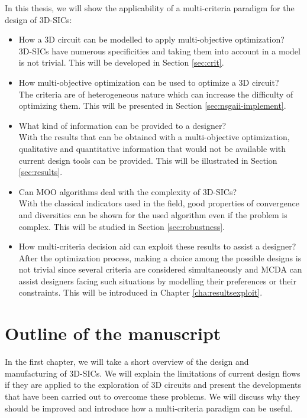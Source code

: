 In this thesis, we will show the applicability of a multi-criteria paradigm for the design of 3D-SICs:
\begin{itemize}
\item How a 3D circuit can be modelled to apply multi-objective optimization?\\
3D-SICs have numerous specificities and taking them into account in a model is not trivial. This will be developed in Section \ref{sec:crit}.

\item How multi-objective optimization can be used to optimize a 3D circuit?\\
The criteria are of heterogeneous nature which can increase the difficulty of optimizing them. This will be presented in Section \ref{sec:nsgaii-implement}.

\item What kind of information can be provided to a designer?\\
With the results that can be obtained with a multi-objective optimization, qualitative and quantitative information that would not be available with current design tools can be provided. This will be illustrated in Section \ref{sec:results}.

\item Can MOO algorithms deal with the complexity of 3D-SICs?\\
With the classical indicators used in the field, good properties of convergence and diversities can be shown for the used algorithm even if the problem is complex. This will be studied in Section \ref{sec:robustness}.

\item How multi-criteria decision aid can exploit these results to assist a designer?\\
After the optimization process, making a choice among the possible designs is not trivial since several criteria are considered simultaneously and MCDA can assist designers facing such situations by modelling their preferences or their constraints. This will be introduced in Chapter \ref{cha:resultsexploit}.

\end{itemize}

\section*{Outline of the manuscript}
In the first chapter, we will take a short overview of the design and manufacturing of 3D-SICs. We will explain the limitations of current design flows if they are applied to the exploration of 3D circuits and present the developments that have been carried out to overcome these problems. We will discuss why they should be improved and introduce how a multi-criteria paradigm can be useful.

